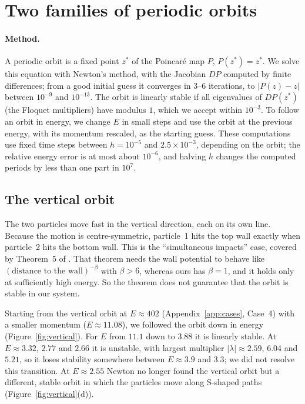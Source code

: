 \documentclass[11pt,a4paper]{article}
\begin{document}
\section{Two families of periodic orbits}\label{app:orbits}
\paragraph{Method.}
A periodic orbit is a fixed point $z^*$ of the Poincar\'e map $P$,
$P(z^*)=z^*$. We solve this equation with Newton's method, with the Jacobian
$DP$ computed by finite differences; from a good initial guess it converges in
3--6 iterations, to $|P(z)-z|$ between $10^{-9}$ and $10^{-13}$. The orbit is
linearly stable if all eigenvalues of $DP(z^*)$ (the Floquet multipliers)
have modulus $1$, which we accept within $10^{-3}$. To follow an orbit in
energy, we change $E$ in small steps and use the orbit at the previous energy,
with its momentum rescaled, as the starting guess. These computations use
fixed time steps between $h=10^{-5}$ and $2.5\times10^{-3}$, depending on the
orbit; the relative energy error is at most about $10^{-6}$, and halving $h$
changes the computed periods by less than one part in $10^7$.

\subsection{The vertical orbit}\label{app:vertical}
The two particles move fast in the vertical direction, each on its own line.
Because the motion is centre-symmetric, particle~1 hits the top wall exactly
when particle~2 hits the bottom wall. This is the ``simultaneous impacts''
case, covered by Theorem~5 of \cite{turaev2022}. That theorem needs the wall
potential to behave like $(\text{distance to the wall})^{-\beta}$ with
$\beta>6$, whereas ours has $\beta=1$, and it holds only at sufficiently high
energy. So the theorem does not guarantee that the orbit is stable in our
system.

Starting from the vertical orbit at $E\approx402$ (Appendix~\ref{app:cases},
Case~4) with a smaller momentum ($E\approx11.08$), we followed the orbit down
in energy (Figure~\ref{fig:vertical}). For $E$ from $11.1$ down to $3.88$ it
is linearly stable. At $E\approx3.32$, $2.77$ and $2.66$ it is unstable, with
largest multiplier $|\lambda|\approx2.59$, $6.04$ and $5.21$, so it loses
stability somewhere between $E\approx3.9$ and $3.3$; we did not resolve this
transition. At $E\approx2.55$ Newton no longer found the vertical orbit but a
different, stable orbit in which the particles move along S-shaped paths
(Figure~\ref{fig:vertical}(d)).
\end{document}
